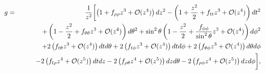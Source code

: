 \documentclass[a4paper,11pt]{article}
\numberwithin{equation}{section}
\begin{document}
\begin{eqnarray}
\label{eq:metnewcoords}
g&=&\frac{1}{z^2}\biggl[ 
\left(1+f_{\rho\rho}z^3+\mathcal{O}(z^4)\right)dz^2 - \left(1+\frac{z^2}{2}+f_{tt}z^3+\mathcal{O}(z^4)\right)dt^2  \\
&&\hspace{0.75cm} + \left(1-\frac{z^2}{2}+f_{\theta\theta}z^3 +\mathcal{O}(z^4) \right)d\theta^2 +  \sin^2\theta \left(1-\frac{z^2}{2}+\frac{f_{\phi\phi}}{\sin^2\theta} z^3 +\mathcal{O}(z^4) \right)d\phi^2\nonumber\\ 
&&\hspace{0.75cm}+ 2 \left( f_{t\theta}z^3 +\mathcal{O}(z^4)\right)dt d\theta + 2 \left( f_{t\phi} z^3+\mathcal{O}(z^4)\right)dt d\phi+ 2 \left(f_{\theta\phi} z^3 +\mathcal{O}(z^4)\right)d\theta d\phi 
 \nonumber\\
&&\hspace{0.75cm}-2\left(f_{t\rho}z^4 +\mathcal{O}(z^5)\right)dtdz-2\left(f_{\rho\theta}z^4+\mathcal{O}(z^5)\right)dzd\theta
-2\left(f_{\rho\phi}z^4 +\mathcal{O}(z^5)\right)dzd\phi\biggr],\nonumber
\end{eqnarray}
\end{document}
